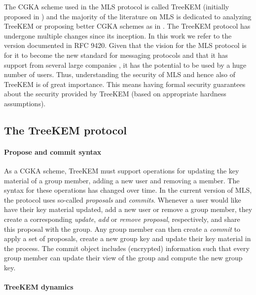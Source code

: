 The CGKA scheme used in the MLS protocol is called TreeKEM (initially proposed in \cite{treekem}) and the majority of the literature on MLS is dedicated to analyzing TreeKEM or proposing better CGKA schemes as in \cite{ttkem,rtreekem,insider-security,modular-group-messaging}. The TreeKEM protocol has undergone multiple changes since its inception. In this work we refer to the version documented in RFC 9420. Given that the vision for the MLS protocol is for it to become the new standard for messaging protocols and that it has support from several large companies \cite{google-mls,mls-support}, it has the potential to be used by a huge number of users. Thus, understanding the security of MLS and hence also of TreeKEM is of great importance. This means having formal security guarantees about the security provided by TreeKEM (based on appropriate hardness assumptions).

\subsection{The TreeKEM protocol} \label{sec:treekem-overview}

\paragraph{Propose and commit syntax}

As a CGKA scheme, TreeKEM must support operations for updating the key material of a group member, adding a new user and removing a member. The syntax for these operations has changed over time. In the current version of MLS, the protocol uses so-called \emph{proposals} and \emph{commits}. Whenever a user would like have their key material updated, add a new user or remove a group member, they create a corresponding \emph{update}, \emph{add} or \emph{remove proposal}, respectively, and share this proposal with the group. Any group member can then create a \emph{commit} to apply a set of proposals, create a new group key and update their key material in the process. The commit object includes (encrypted) information such that every group member can update their view of the group and compute the new group key.

\paragraph{TreeKEM dynamics}

